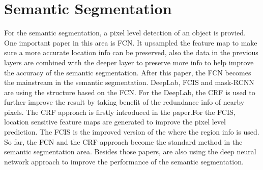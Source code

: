 \documentclass[a4paper,12pt]{article}
\begin{document}


\section{Semantic Segmentation}
For the semantic segmentation, a pixel level detection of an object is provied. One important paper in this area is FCN\cite{DBLP:journals/corr/ShelhamerLD16}. It upsampled the feature map to make sure a more accurate location info can be preserved, also the data in the previous layers are combined with the deeper layer to preserve more info to help improve the accuracy of the semantic segmentation. After this paper, the FCN becomes the mainstream in the semantic segmentation.  DeepLab\cite{DBLP:journals/corr/ChenPK0Y16}, FCIS\cite{DBLP:journals/corr/LiQDJW16} and mask-RCNN\cite{DBLP:journals/corr/HeGDG17} are using the structure based on the FCN. For the DeepLab\cite{DBLP:journals/corr/ChenPK0Y16}, the CRF is used to further improve the result by taking benefit of the redundance info of nearby pixels. The CRF approach is firstly introduced in the paper\cite{DBLP:journals/corr/ZhengJRVSDHT15}.For the FCIS\cite{DBLP:journals/corr/LiQDJW16}, location sensitive feature maps are generated to improve the pixel level prediction. The FCIS\cite{DBLP:journals/corr/LiQDJW16} is the improved version of the \cite{DBLP:journals/corr/DaiLHS16} where the region info is used. So far, the FCN and the CRF approach become the standard method in the semantic segmentation area. Besides those papers, \cite{DBLP:journals/corr/HariharanAGM14a}\cite{DBLP:journals/corr/PinheiroCD15} are also using the deep neural network approach to improve the performance of the semantic segmentation.\\
\end{document}
